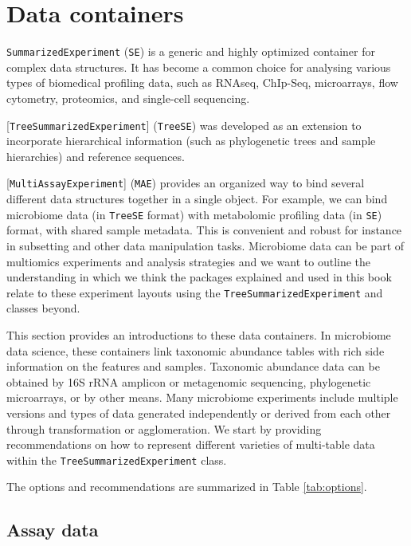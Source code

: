 \documentclass[
]{book}
\begin{document}
\hypertarget{data-containers}{%
\section{Data containers}\label{data-containers}}

\texttt{SummarizedExperiment} (\texttt{SE}) \citep{R_SummarizedExperiment} is a generic and highly optimized container for complex data
structures. It has become a common choice for analysing various types
of biomedical profiling data, such as RNAseq, ChIp-Seq, microarrays,
flow cytometry, proteomics, and single-cell
sequencing.

{[}\texttt{TreeSummarizedExperiment}{]} (\texttt{TreeSE}) \citep{R_TreeSummarizedExperiment} was developed as an extension to incorporate hierarchical
information (such as phylogenetic trees and sample hierarchies) and
reference sequences.

{[}\texttt{MultiAssayExperiment}{]} (\texttt{MAE}) \citep{Ramos2017} provides an organized way to bind several different data
structures together in a single object. For example, we can bind
microbiome data (in \texttt{TreeSE} format) with metabolomic profiling data
(in \texttt{SE}) format, with shared sample metadata. This is convenient and
robust for instance in subsetting and other data manipulation
tasks. Microbiome data can be part of multiomics experiments and
analysis strategies and we want to outline the understanding in which
we think the packages explained and used in this book relate to these
experiment layouts using the \texttt{TreeSummarizedExperiment} and classes
beyond.

This section provides an introductions to these data containers. In
microbiome data science, these containers link taxonomic abundance
tables with rich side information on the features and
samples. Taxonomic abundance data can be obtained by 16S rRNA amplicon
or metagenomic sequencing, phylogenetic microarrays, or by other
means. Many microbiome experiments include multiple versions and types
of data generated independently or derived from each other through
transformation or agglomeration. We start by providing recommendations
on how to represent different varieties of multi-table data within the
\texttt{TreeSummarizedExperiment} class.

The options and recommendations are summarized in Table \ref{tab:options}.

\hypertarget{assay-slot}{%
\subsection{Assay data}\label{assay-slot}}
\end{document}
